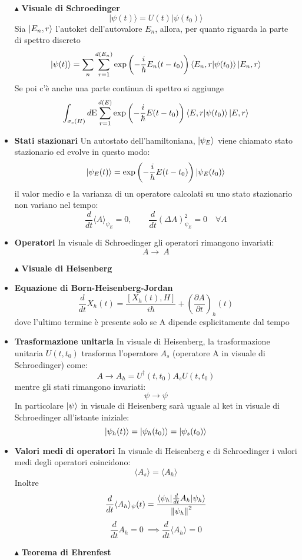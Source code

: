 \documentclass{book}
\newcommand{\g}{\textbf}
\newcommand{\e}{\begin{equation}}
\newcommand{\ex}{\end{equation} }
\renewcommand{\it}{\item[$\cdot$]}
\begin{document}
\begin{multicols}{4}
\begin{itemize}
    \item [$\blacktriangle$] \g{Visuale di Schroedinger}
        \e{|\psi(t)\rangle = U(t) |\psi(t_{0})\rangle} \ex
        Sia $\ket{E_{n}, r}$ l’autoket dell’autovalore $E_n$, allora, per quanto riguarda la parte di spettro discreto
        \e{|\psi(t)\rangle = \sum_n \sum_{r=1}^{d(E_{n})}\exp\left(-\frac{i}{\hbar} E_n(t - t_0)\right) \braket{E_{n}, r}{\psi(t_{0})} \ket{E_{n},r}} \ex
        Se poi c'è anche una parte continua di spettro si aggiunge
        \e{\int_{\sigma_{c}(H)}d\text{E}\sum_{r=1}^{d(E)}\exp\left(-\frac{i}{\hbar} E(t - t_0)\right) \braket{E, r}{\psi(t_{0})} \ket{E,r}}\ex
        \it \g{Stati stazionari}
Un autostato dell'hamiltoniana, $\ket{\psi_{E}}$ viene chiamato stato stazionario ed evolve in questo modo:
\e{\ket{\psi_{E}(t)} = \text{exp}\left(-\frac{i}{h}E(t-t_{0})\right)\ket{\psi_{E}(t_{0})}}\ex
il valor medio e la varianza di un operatore calcolati su uno stato stazionario non variano nel tempo:
\e{\frac{d}{dt}\langle A \rangle_{\psi_{E}} = 0, \qquad \frac{d}{dt}(\Delta A)^{2}_{\psi_{E}} = 0 \quad \forall A} \label{valor medio stato stazionario}\ex
\it \g{Operatori}       
In visuale di Schroedinger gli operatori rimangono invariati:
\e{A \rightarrow \ A}\ex
\item [$\blacktriangle$] \g{Visuale di Heisenberg}
    \it \g{Equazione di Born-Heisenberg-Jordan}
        \e{\frac{d}{dt} X_h(t) = \frac{[X_h(t), H]}{i\hbar} + \left(\frac{\partial A}{\partial t}\right)_{h}(t)} \ex
        dove l'ultimo termine è presente solo se A dipende esplicitamente dal tempo
    \it \g{Trasformazione unitaria}
        In visuale di Heisenberg, la trasformazione unitaria $U(t, t_{0})$ trasforma l’operatore $A_{s}$ (operatore A in visuale di Schroedinger) come:
        \e{A \to A_{h} = U^\dagger(t, t_{0}) A_{s} U(t, t_{0})} \ex
        mentre gli stati rimangono invariati:
        \e{\psi \to \psi} \ex
        In particolare $\ket{\psi}$ in visuale di Heisenberg sarà uguale al ket in visuale di Schroedinger all'istante iniziale:
        \e{\ket{\psi_{h}(t)} = \ket{\psi_{h}(t_{0})} = \ket{\psi_{s}(t_{0})}}\ex
        \it \g{Valori medi di operatori}
        In visuale di Heisenberg e di Schroedinger i valori medi degli operatori coincidono:
        \e{\langle A_{s}\rangle = \langle A_{h}\rangle}\ex
        Inoltre
        \e{\frac{d}{dt}\langle A_{h}\rangle_{\psi}(t) = \frac{\langle \psi_{h} | \frac{d}{dt}A_{h}| \psi_{h}\rangle}{\norm{\psi_{h}}^{2}}}\ex
        \e{\frac{d}{dt}A_{h} = 0 \  \implies \frac{d}{dt}\langle A_{h}\rangle = 0}\ex
        \item [$\blacktriangle$] \g{Teorema di Ehrenfest}

\end{itemize}
\end{multicols}
\end{document}
